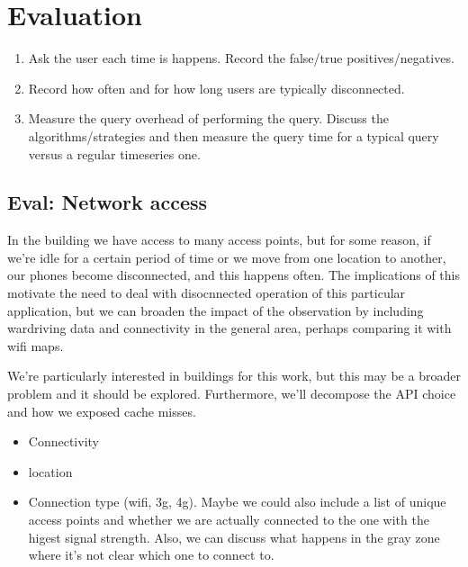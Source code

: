 \documentclass[10pt,print,letterpaper]{sigplan-proc-varsize}
\begin{document}
\section{Evaluation}
\begin{enumerate}
\item Ask the user each time is happens.  Record the false/true positives/negatives.
\item Record how often and for how long users are typically disconnected.
\item Measure the query overhead of performing the query.  Discuss the algorithms/strategies and
		then measure the query time for a typical query versus a regular timeseries one. 
\end{enumerate}


\subsection{Eval: Network access}
In the building we have access to many access points, but for some reason, if we're idle for a certain period
of time or we move from one location to another, our phones become disconnected, and this happens often.
The implications of this motivate the need to deal with disocnnected operation of this particular application, but
we can broaden the impact of the observation by including wardriving data and connectivity in the general area, perhaps
comparing it with wifi maps.

We're particularly interested in buildings for this work, but this may be a broader problem and it should be explored.
Furthermore, we'll decompose the API choice and how we exposed cache misses.

\begin{itemize}
\item Connectivity
\item location
\item Connection type (wifi, 3g, 4g).  Maybe we could also include a list of unique access points and whether we
are actually connected to the one with the higest signal strength.  Also, we can discuss what happens in the gray zone
where it's not clear which one to connect to.
\end{itemize}


% 
\end{document}
